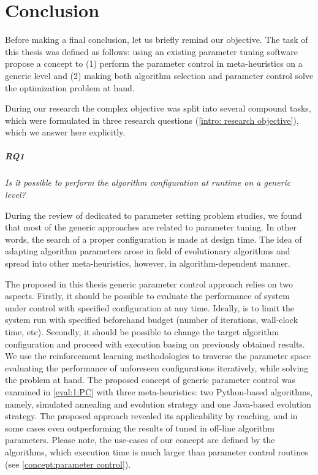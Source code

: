 \chapter{Conclusion}\label{conclusion}
Before making a final conclusion, let us briefly remind our objective.
The task of this thesis was defined as follows: using an existing parameter tuning software propose a concept to (1) perform the parameter control in meta-heuristics on a generic level and (2) making both algorithm selection and parameter control solve the optimization problem at hand.

During our research the complex objective was split into several compound tasks, which were formulated in three research questions (\cref{intro: research objective}), which we answer here explicitly.

\paragraph{RQ1} \emph{Is it possible to perform the algorithm configuration at runtime on a generic level?}
	
During the review of dedicated to parameter setting problem studies, we found that most of the generic approaches are related to parameter tuning. In other words, the search of a proper configuration is made at design time. The idea of adapting algorithm parameters arose in field of evolutionary algorithms and spread into other meta-heuristics, however, in algorithm-dependent manner. 

The proposed in this thesis generic parameter control approach relies on two aspects. Firstly, it should be possible to evaluate the performance of system under control with specified configuration at any time. Ideally, is to limit the system run with specified beforehand budget (number of iterations, wall-clock time, etc). Secondly, it should be possible to change the target algorithm configuration and proceed with execution basing on previously obtained results. We use the reinforcement learning methodologies to traverse the parameter space evaluating the performance of unforeseen configurations iteratively, while solving the problem at hand. The proposed concept of generic parameter control was examined in \cref{eval:1:PC} with three meta-heuristics: two Python-based algorithms, namely, simulated annealing and evolution strategy and one Java-based evolution strategy. The proposed approach revealed its applicability by reaching, and in some cases even outperforming the results of tuned in off-line algorithm parameters. Please note, the use-cases of our concept are defined by the algorithms, which execution time is much larger than parameter control routines (see \cref{concept:parameter control}).

